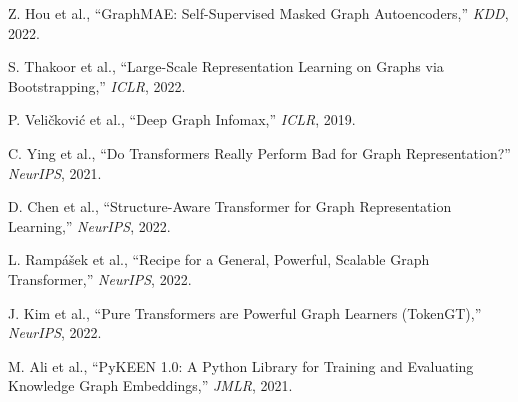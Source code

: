 \documentclass[12pt,a4paper]{article}
\begin{document}
\begin{enumerate}[leftmargin=1.5em, label={[\arabic*]}]
  \item Z. Hou et al., ``GraphMAE: Self-Supervised Masked Graph Autoencoders,''
        \textit{KDD}, 2022.
  \item S. Thakoor et al., ``Large-Scale Representation Learning on Graphs
        via Bootstrapping,'' \textit{ICLR}, 2022.
  \item P. Veli\v{c}kovi\'{c} et al., ``Deep Graph Infomax,'' \textit{ICLR},
        2019.
  \item C. Ying et al., ``Do Transformers Really Perform Bad for Graph
        Representation?'' \textit{NeurIPS}, 2021.
  \item D. Chen et al., ``Structure-Aware Transformer for Graph
        Representation Learning,'' \textit{NeurIPS}, 2022.
  \item L. Ramp\'{a}\v{s}ek et al., ``Recipe for a General, Powerful, Scalable
        Graph Transformer,'' \textit{NeurIPS}, 2022.
  \item J. Kim et al., ``Pure Transformers are Powerful Graph Learners
        (TokenGT),'' \textit{NeurIPS}, 2022.
  \item M. Ali et al., ``PyKEEN 1.0: A Python Library for Training and
        Evaluating Knowledge Graph Embeddings,'' \textit{JMLR}, 2021.
\end{enumerate}
\end{document}
